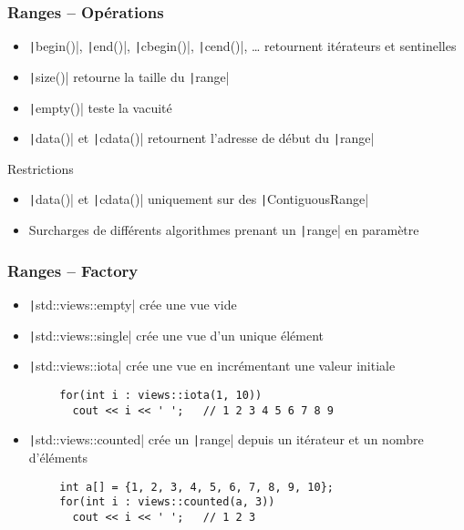 \documentclass[C++.tex]{subfiles}
\begin{document}
\begin{frame}
	\frametitle{Ranges -- Opérations}
	\begin{itemize}
		\item \texttt|begin()|, \texttt|end()|, \texttt|cbegin()|, \texttt|cend()|, \ldots{} retournent itérateurs et sentinelles
		\item \texttt|size()| retourne la taille du \texttt|range|
		\item \texttt|empty()| teste la vacuité
		\item \texttt|data()| et \texttt|cdata()| retournent l'adresse de début du \texttt|range|
	\end{itemize}

	\begin{alertblock}{Restrictions}
		\begin{itemize}
			\item \texttt|data()| et \texttt|cdata()| uniquement sur des \texttt|ContiguousRange|
		\end{itemize}
	\end{alertblock}

	\begin{itemize}
		\item Surcharges de différents algorithmes prenant un \texttt|range| en paramètre
	\end{itemize}
\end{frame}

\begin{frame}[fragile]
	\frametitle{Ranges -- Factory}
	\begin{itemize}
		\item \texttt|std::views::empty| crée une vue vide
		\item \texttt|std::views::single| crée une vue d'un unique élément
		\item \texttt|std::views::iota| crée une vue en incrémentant une valeur initiale
	\end{itemize}

	\begin{verbatim}
		for(int i : views::iota(1, 10))
		  cout << i << ' ';   // 1 2 3 4 5 6 7 8 9
  	\end{verbatim}

	\begin{itemize}
		\item \texttt|std::views::counted| crée un \texttt|range| depuis un itérateur et un nombre d'éléments
	\end{itemize}

	\begin{verbatim}
		int a[] = {1, 2, 3, 4, 5, 6, 7, 8, 9, 10};
		for(int i : views::counted(a, 3))
		  cout << i << ' ';   // 1 2 3
  	\end{verbatim}
\end{frame}
\end{document}
